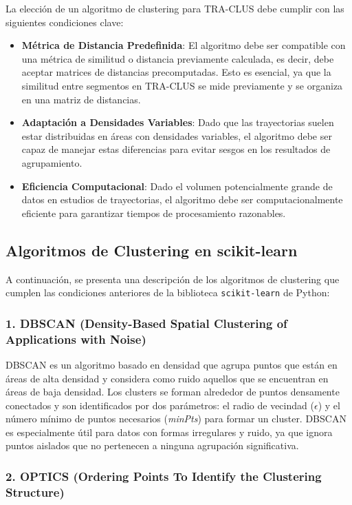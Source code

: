 La elección de un algoritmo de clustering para TRA-CLUS debe cumplir con las siguientes condiciones clave:
\begin{itemize}
    \item \textbf{Métrica de Distancia Predefinida}: El algoritmo debe ser compatible con una métrica de similitud o distancia previamente calculada, es decir, debe aceptar matrices de distancias precomputadas. Esto es esencial, ya que la similitud entre segmentos en TRA-CLUS se mide previamente y se organiza en una matriz de distancias.
    \item \textbf{Adaptación a Densidades Variables}: Dado que las trayectorias suelen estar distribuidas en áreas con densidades variables, el algoritmo debe ser capaz de manejar estas diferencias para evitar sesgos en los resultados de agrupamiento.
    \item \textbf{Eficiencia Computacional}: Dado el volumen potencialmente grande de datos en estudios de trayectorias, el algoritmo debe ser computacionalmente eficiente para garantizar tiempos de procesamiento razonables.
\end{itemize}

\subsection*{Algoritmos de Clustering en scikit-learn}

A continuación, se presenta una descripción de los algoritmos de clustering que cumplen las condiciones anteriores de la biblioteca \texttt{scikit-learn} de Python:

\subsubsection*{1. DBSCAN (Density-Based Spatial Clustering of Applications with Noise)}

DBSCAN es un algoritmo basado en densidad que agrupa puntos que están en áreas de alta densidad y considera como ruido aquellos que se encuentran en áreas de baja densidad. Los clusters se forman alrededor de puntos densamente conectados y son identificados por dos parámetros: el radio de vecindad (\(\epsilon\)) y el número mínimo de puntos necesarios (\textit{minPts}) para formar un cluster. DBSCAN es especialmente útil para datos con formas irregulares y ruido, ya que ignora puntos aislados que no pertenecen a ninguna agrupación significativa.

\subsubsection*{2. OPTICS (Ordering Points To Identify the Clustering Structure)}

